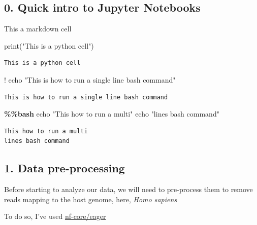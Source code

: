 \documentclass[
  letterpaper,
]{book}
\newenvironment{Shaded}{}{}
\newcommand{\BuiltInTok}[1]{\textcolor[rgb]{0.84,0.23,0.29}{#1}}
\newcommand{\ExtensionTok}[1]{\textcolor[rgb]{0.84,0.23,0.29}{\textbf{#1}}}
\newcommand{\NormalTok}[1]{\textcolor[rgb]{0.14,0.16,0.18}{#1}}
\newcommand{\OperatorTok}[1]{\textcolor[rgb]{0.14,0.16,0.18}{#1}}
\newcommand{\StringTok}[1]{\textcolor[rgb]{0.01,0.18,0.38}{#1}}
\begin{document}
\hypertarget{quick-intro-to-jupyter-notebooks}{%
\subsection{0. Quick intro to Jupyter
Notebooks}\label{quick-intro-to-jupyter-notebooks}}

This a markdown cell

\begin{Shaded}
\begin{Highlighting}[]
\BuiltInTok{print}\NormalTok{(}\StringTok{"This is a python cell"}\NormalTok{)}
\end{Highlighting}
\end{Shaded}

\begin{verbatim}
This is a python cell
\end{verbatim}

\begin{Shaded}
\begin{Highlighting}[]
\OperatorTok{!}\NormalTok{ echo }\StringTok{"This is how to run a single line bash command"}
\end{Highlighting}
\end{Shaded}

\begin{verbatim}
This is how to run a single line bash command
\end{verbatim}

\begin{Shaded}
\begin{Highlighting}[]
\ExtensionTok{\%\%bash}
\BuiltInTok{echo} \StringTok{"This how to run a multi"}
\BuiltInTok{echo} \StringTok{"lines bash command"}
\end{Highlighting}
\end{Shaded}

\begin{verbatim}
This how to run a multi
lines bash command
\end{verbatim}

\hypertarget{data-pre-processing}{%
\subsection{1. Data pre-processing}\label{data-pre-processing}}

Before starting to analyze our data, we will need to pre-process them to
remove reads mapping to the host genome, here, \emph{Homo sapiens}

To do so, I've used
\href{https://github.com/nf-core/eager}{nf-core/eager}
\end{document}
